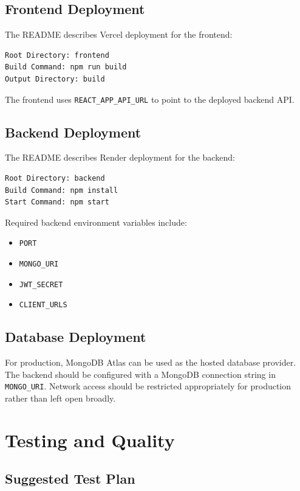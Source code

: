 \documentclass[12pt,a4paper]{report}
\begin{document}
\section{Frontend Deployment}

The README describes Vercel deployment for the frontend:

\begin{lstlisting}
Root Directory: frontend
Build Command: npm run build
Output Directory: build
\end{lstlisting}

The frontend uses \texttt{REACT\_APP\_API\_URL} to point to the deployed backend API.

\section{Backend Deployment}

The README describes Render deployment for the backend:

\begin{lstlisting}
Root Directory: backend
Build Command: npm install
Start Command: npm start
\end{lstlisting}

Required backend environment variables include:

\begin{itemize}
  \item \texttt{PORT}
  \item \texttt{MONGO\_URI}
  \item \texttt{JWT\_SECRET}
  \item \texttt{CLIENT\_URLS}
\end{itemize}

\section{Database Deployment}

For production, MongoDB Atlas can be used as the hosted database provider. The backend should be configured with a MongoDB connection string in \texttt{MONGO\_URI}. Network access should be restricted appropriately for production rather than left open broadly.

\chapter{Testing and Quality}

\section{Suggested Test Plan}
\end{document}

